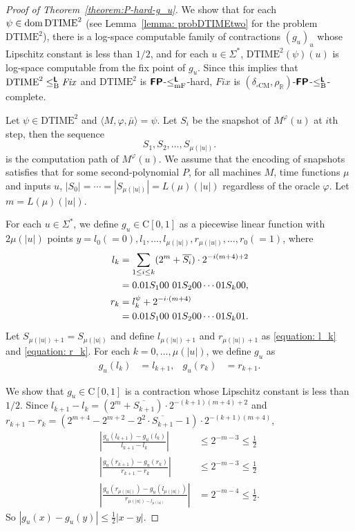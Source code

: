 \documentclass[conference]{IEEEtran}
\newcommand{\R}{\mathbb R}
\newcommand{\classtwofont}[1]{\text{\bfseries \sffamily \upshape #1}}
\newcommand{\classLtwo}{\classtwofont{L}}
\newcommand{\classFPtwo}{\classtwofont{FP}}
\newcommand{\deltaboxCM}{\delta _{\square \mathrm{CM}}}
\newcommand{\rhoR}{\rho _\R}
\newcommand{\redmF}{\leq _{\mathrm{mF}}}
\newcommand{\redB}{\leq _{\mathrm B}}
\newcommand{\redLmF}{\redmF ^{\classLtwo}}
\newcommand{\redLB}{\redB ^{\classLtwo}}
\newcommand{\classC}{\mathrm C}
\newcommand{\OpCMFix}{\mathit{Fix}}
\newcommand{\probDTIMEtwo}{\mathrm{DTIME}^2}
\newcommand{\dom}{\mathop{\rm dom}}
\theoremstyle{definition}
\theoremstyle{remark}
\begin{document}
\begin{proof}[Proof of Theorem~\ref{theorem:P-hard-g_u}]
 We show that for each $\psi \in \dom \probDTIMEtwo$
 (see Lemma~\ref{lemma: probDTIMEtwo} for the problem $\probDTIMEtwo$),
 there is a log-space computable family of contractions $(g_u)_u$ whose
 Lipschitz constant is less than $1/2$,
 and for each $u \in \varSigma^*$, $\probDTIMEtwo(\psi)(u)$ is log-space 
 computable from the fix point of $g_u$.
 Since this implies that $\probDTIMEtwo \redLB \OpCMFix$ and $\probDTIMEtwo$
 is $\classFPtwo$-$\redLmF$-hard, $\OpCMFix$ is 
 $(\deltaboxCM, \rhoR)$-$\classFPtwo$-$\redLB$-complete.

 Let $\psi \in \probDTIMEtwo$ and $\langle M, \varphi, \bar \mu \rangle = \psi$.
 Let $S_i$ be the snapshot of $M^\varphi(u)$ at $i$th step, then the sequence
 \begin{equation}
  S_1, S_2, \dots, S_{\mu(|u|)}.
 \end{equation}
 is the computation path of $M^\varphi(u)$.
 We assume that the encoding of snapshots satisfies that 
 for some second-polynomial $P$, for all machines $M$, time functions $\mu$ 
 and inputs $u$, $|S_0| = \cdots = |S_{\mu(|u|)}| = L(\mu)(|u|)$
 regardless of the oracle $\varphi$.
 Let $m = L(\mu)(|u|)$.


 For each $u \in \varSigma^*$, we define $g_u \in \classC[0,1]$ as
 a piecewise linear function with $2\mu(|u|)$ points
 $y = l_0 (=0), l_1, \dots, l_{\mu(|u|)}, r_{\mu(|u|)}, \dots, r_0(=1)$,
 where
\begin{alignat}{2}
 \label{equation: l_k}
 l_k 
 &
 = \sum_{1 \le i \le k} (2^m+\overline{S_i}) \cdot 2^{-i(m+4)+2} 
\notag
 \\
 &
 = 0.01S_100\ 01S_200 \cdots 01S_k00,
 \\
 \label{equation: r_k}
 r_k
 &
 = l^\psi_k + 2^{-i \cdot (m+4)}
\notag
 \\
 &
 = 0.01S_100\ 01S_200 \cdots 01S_k01.
\end{alignat}
 Let $S_{\mu(|u|)+1} = S_{\mu(|u|)}$ and
 define $l_{\mu(|u|)+1}$ and $r_{\mu(|u|)+1}$ as
 \eqref{equation: l_k} and \eqref{equation: r_k}.
 For each $k = 0, \dots, \mu(|u|)$,
 we define $g_u$ as
 \begin{align}
 g_u(l_k) &= l_{k+1},
 &
 g_u(r_k) &= r_{k+1}.
 \end{align}

 We show that $g_u \in \classC[0,1]$ is a contraction whose Lipschitz constant
 is less than $1/2$.
 Since $l_{k+1} - l_{k} = (2^m+\overline{S_{k+1}}) \cdot 2^{-(k+1)(m+4)+2} $
 and $r_{k+1} - r_{k} = (2^{m+4} - 2^{m+2} - 2^2 \cdot \overline{S_{k+1}} - 1)
 \cdot 2^{-(k+1)(m+4)} $,
\begin{align}
 \left|\frac{g_u(l_{k+1}) - g_u(l_k)}{l_{k+1} - l_k} \right| 
 &
 \le 2^{-m-3} \le \frac 1 2
 \\
 \left|\frac{g_u(r_{k+1}) - g_u(r_k)}{r_{k+1} - r_k} \right| 
 &
 \le 2^{-m-3} \le \frac 1 2
 \\
 \left|\frac{g_u(r_{\mu(|u|)}) - g_u(l_{\mu(|u|)})}{r_{\mu(|u|) - l_{\mu(|u|)}}} \right| 
 &
 = 2^{-m-4} \le \frac 1 2.
\end{align}
 So $|g_u(x) - g_u(y)| \le \frac 1 2 |x-y|$.


\end{proof}
\end{document}
